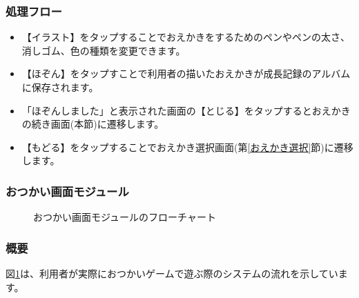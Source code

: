 \documentclass[a4j]{jarticle}
\begin{document}
\subsubsection*{処理フロー}
\begin{itemize}
\item【イラスト】をタップすることでおえかきをするためのペンやペンの太さ、消しゴム、色の種類を変更できます。
\item【ほぞん】をタップすことで利用者の描いたおえかきが成長記録のアルバムに保存されます。
\item「ほぞんしました」と表示された画面の【とじる】をタップするとおえかきの続き画面(本節)に遷移します。
\item【もどる】をタップすることでおえかき選択画面(第\ref{おえかき選択}節)に遷移します。
\end{itemize}


\newpage

\subsubsection{おつかい画面モジュール\label{おつかい}}
\begin{figure}[H]
    \begin{center}
    \caption {おつかい画面モジュールのフローチャート}
    \label{otukai}
    \end{center}
\end{figure}

\subsubsection*{概要}
図\ref{otukai}は、利用者が実際におつかいゲームで遊ぶ際のシステムの流れを示しています。
\end{document}
